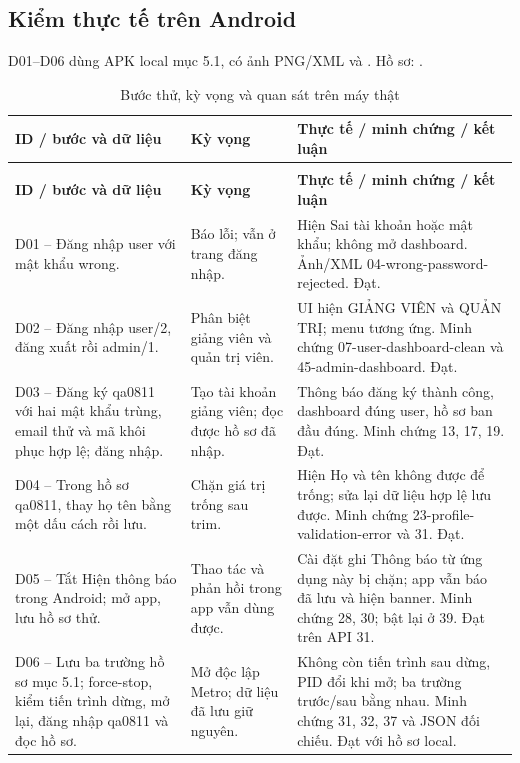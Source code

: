 \subsection{Kiểm thực tế trên Android}
D01--D06 dùng APK local mục 5.1, có ảnh PNG/XML và . Hồ sơ:  \cite{currenttests}.
{\tabletext\renewcommand{\arraystretch}{1.04}\begin{longtable}{>{\raggedright\arraybackslash}p{}>{\raggedright\arraybackslash}p{}>{\raggedright\arraybackslash}p{}}
\caption{Bước thử, kỳ vọng và quan sát trên máy thật}\label{tab:android-cases}\\
\toprule \textbf{ID / bước và dữ liệu} & \textbf{Kỳ vọng} & \textbf{Thực tế / minh chứng / kết luận}\\\midrule
\endfirsthead
\multicolumn{3}{l}{\small Kiểm thực tế trên Android (tiếp)}\\
\toprule \textbf{ID / bước và dữ liệu} & \textbf{Kỳ vọng} & \textbf{Thực tế / minh chứng / kết luận}\\\midrule
\endhead
\bottomrule\endlastfoot
D01 -- Đăng nhập user với mật khẩu wrong. & Báo lỗi; vẫn ở trang đăng nhập. & Hiện Sai tài khoản hoặc mật khẩu; không mở dashboard. Ảnh/XML 04-wrong-password-rejected. Đạt.\\
D02 -- Đăng nhập user/2, đăng xuất rồi admin/1. & Phân biệt giảng viên và quản trị viên. & UI hiện GIẢNG VIÊN và QUẢN TRỊ; menu tương ứng. Minh chứng 07-user-dashboard-clean và 45-admin-dashboard. Đạt.\\
D03 -- Đăng ký qa0811 với hai mật khẩu trùng, email thử và mã khôi phục hợp lệ; đăng nhập. & Tạo tài khoản giảng viên; đọc được hồ sơ đã nhập. & Thông báo đăng ký thành công, dashboard đúng user, hồ sơ ban đầu đúng. Minh chứng 13, 17, 19. Đạt.\\
D04 -- Trong hồ sơ qa0811, thay họ tên bằng một dấu cách rồi lưu. & Chặn giá trị trống sau trim. & Hiện Họ và tên không được để trống; sửa lại dữ liệu hợp lệ lưu được. Minh chứng 23-profile-validation-error và 31. Đạt.\\
D05 -- Tắt Hiện thông báo trong Android; mở app, lưu hồ sơ thử. & Thao tác và phản hồi trong app vẫn dùng được. & Cài đặt ghi Thông báo từ ứng dụng này bị chặn; app vẫn báo đã lưu và hiện banner. Minh chứng 28, 30; bật lại ở 39. Đạt trên API 31.\\*
D06 -- Lưu ba trường hồ sơ mục 5.1; force-stop, kiểm tiến trình dừng, mở lại, đăng nhập qa0811 và đọc hồ sơ. & Mở độc lập Metro; dữ liệu đã lưu giữ nguyên. & Không còn tiến trình sau dừng, PID đổi khi mở; ba trường trước/sau bằng nhau. Minh chứng 31, 32, 37 và JSON đối chiếu. Đạt với hồ sơ local.\\
\end{longtable}}

